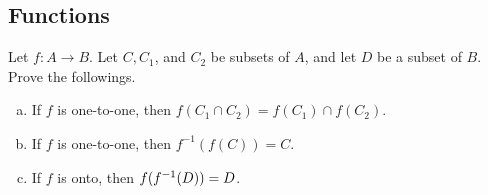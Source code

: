 \subsection{Functions}
\begin{question}
	\label{question:FunctionSetManipulation}
	Let $f: A \rightarrow B$. Let $C, C_1$, and $C_2$ be subsets of $A$, and let $D$ be a subset of $B$. Prove the followings. 
	\begin{enumerate}[(a)]
		\item If $f$ is one-to-one, then $f(C_1 \cap C_2) = f(C_1) \cap f(C_2)$.
		\item If $f$ is one-to-one, then $f^{-1}(f(C))=C$.
		\item If $f$ is onto, then $f(f^{-1}(D)) = D$. 
	\end{enumerate}
\end{question}

